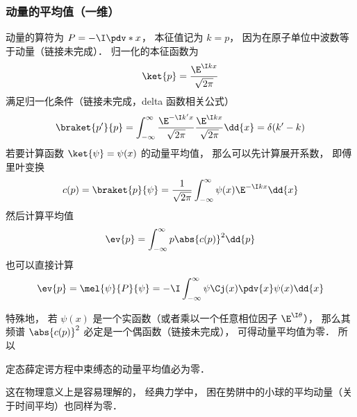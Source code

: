 \subsubsection{动量的平均值（一维）}
动量的算符为 $P = -\I\pdv*{x}$， 本征值记为 $k = p$， 因为在原子单位中波数等于动量（链接未完成）． 归一化的本征函数为
\begin{equation}
\ket{p} = \frac{\E^{\I k x}}{\sqrt{2\pi}}
\end{equation}
满足归一化条件（链接未完成，delta 函数相关公式）
\begin{equation}
\braket{p'}{p} = \int_{-\infty}^{\infty} \frac{\E^{-\I k' x}}{\sqrt{2\pi}} \frac{\E^{\I k x}}{\sqrt{2\pi}} \dd{x} = \delta(k' - k)
\end{equation}
若要计算函数 $\ket{\psi} = \psi(x)$ 的动量平均值， 那么可以先计算展开系数， 即傅里叶变换
\begin{equation}
c(p) = \braket{p}{\psi} = \frac{1}{\sqrt{2\pi}}\int_{-\infty}^{\infty} \psi(x)\E^{-\I kx} \dd{x}
\end{equation}
然后计算平均值
\begin{equation}
\ev{p} = \int_{-\infty}^{\infty} p \abs{c(p)}^2\dd{p}
\end{equation}
也可以直接计算
\begin{equation}
\ev{p} = \mel{\psi}{P}{\psi} = -\I\int_{-\infty}^{\infty} \psi\Cj(x) \pdv{x} \psi(x) \dd{x}
\end{equation}


特殊地， 若 $\psi(x)$ 是一个实函数（或者乘以一个任意相位因子 $\E^{\I \theta}$）， 那么其频谱 $\abs{c(p)}^2$ 必定是一个偶函数（链接未完成）， 可得动量平均值为零． 所以
\begin{theorem}{}
定态薛定谔方程中束缚态的动量平均值必为零．
\end{theorem}
这在物理意义上是容易理解的， 经典力学中， 困在势阱中的小球的平均动量（关于时间平均）也同样为零．

